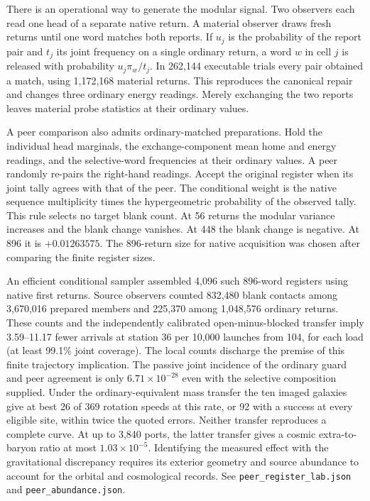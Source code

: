 \documentclass[11pt]{article}
\begin{document}
There is an operational way to generate the modular signal. Two
observers each read one head of a separate native return. A material
observer draws fresh returns until one word matches both reports. If
\(u_j\) is the probability of the report pair and \(t_j\) its joint
frequency on a single ordinary return, a word \(w\) in cell \(j\)
is released with probability \(u_j\pi_w/t_j\). In 262,144 executable
trials every pair obtained a match, using 1,172,168 material returns.
This reproduces the canonical repair and changes three ordinary
energy readings. Merely exchanging the two reports leaves material
probe statistics at their ordinary values.

A peer comparison also admits ordinary-matched preparations. Hold
the individual head marginals, the exchange-component mean home and
energy readings, and the selective-word frequencies at their ordinary
values. A peer randomly re-pairs the right-hand readings. Accept the
original register when its joint tally agrees with that of the peer.
The conditional weight is the native sequence multiplicity times the
hypergeometric probability of the observed tally. This rule selects
no target blank count. At 56 returns the modular variance increases
and the blank change vanishes. At 448 the blank change is negative.
At 896 it is \(+0.01263575\). The 896-return size for native
acquisition was chosen after comparing the finite register sizes.

An efficient conditional sampler assembled 4,096 such 896-word
registers using native first returns. Source observers counted
832,480 blank contacts among 3,670,016 prepared members and 225,370
among 1,048,576 ordinary returns. These counts and the independently
calibrated open-minus-blocked transfer imply 3.59--11.17 fewer
arrivals at station 36 per 10,000 launches from 104, for each load
(at least 99.1\% joint coverage). The local counts discharge the
premise of this finite trajectory implication. The passive joint
incidence of the ordinary guard and peer agreement is only
\(6.71\times10^{-28}\) even with the selective composition supplied.
Under the ordinary-equivalent mass transfer the ten imaged galaxies
give at best 26 of 369 rotation speeds at this rate, or 92 with a
success at every eligible site, within twice the quoted errors.
Neither transfer reproduces a complete curve. At up to 3,840 ports,
the latter transfer gives a cosmic extra-to-baryon ratio at most
\(1.03\times10^{-5}\). Identifying the measured effect with the
gravitational discrepancy requires its exterior geometry and source
abundance to account for the orbital and cosmological records.
See \texttt{peer\_register\_lab.json} and \texttt{peer\_abundance.json}.
\end{document}
